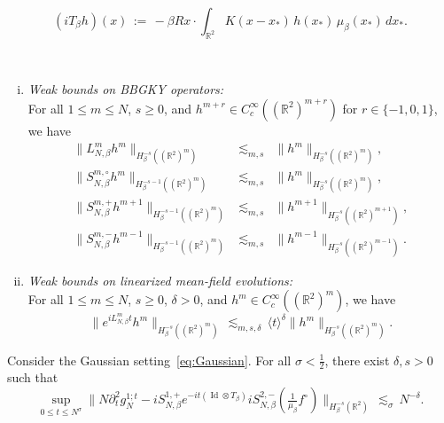 \documentclass[10pt,a4paper]{amsart}
\newcommand{\Id}{\operatorname{Id}}
\newcommand{\R}{\mathbb R}
\begin{document}
\begin{equation}\label{eq:def-Lbeta}
(iT_\beta h)(x)\,:=\,-\beta Rx\cdot\int_{\R^2} K(x-x_*) \,h(x_*)\,\mu_\beta(x_*)\,dx_*.
\end{equation}

\begin{lem}\label{lem:prelest-LS}\
\begin{enumerate}[(i)]
\item \emph{Weak bounds on BBGKY operators:}\\
For all $1\le m\le N$, $s\ge0$, and $h^{m+r}\in C^\infty_c((\R^2)^{m+r})$ for $r\in\{-1,0,1\}$, we have
\begin{eqnarray*}
\|L^{m}_{N,\beta}h^{m}\|_{H^{-s}_\beta((\R^2)^m)}&\lesssim_{m,s}&\|h^{m}\|_{H^{-s}_\beta((\R^2)^{m})},\\
\|S^{m,\circ}_{N,\beta}h^{m}\|_{H^{-s-1}_\beta((\R^2)^m)}&\lesssim_{m,s}&\|h^{m}\|_{H^{-s}_\beta((\R^2)^{m})},\\
\|S^{m,+}_{N,\beta}h^{m+1}\|_{H^{-s-1}_\beta((\R^2)^m)}&\lesssim_{m,s}&\|h^{m+1}\|_{H^{-s}_\beta((\R^2)^{m+1})},\\
\|S^{m,-}_{N,\beta}h^{m-1}\|_{H^{-s-1}_\beta((\R^2)^m)}&\lesssim_{m,s}&\|h^{m-1}\|_{H^{-s}_\beta((\R^2)^{m-1})}.
\end{eqnarray*}
\item \emph{Weak bounds on linearized mean-field evolutions:}\\
For all $1\le m\le N$, $s\ge0$, $\delta>0$, and $h^m\in C^\infty_c((\R^2)^{m})$, we have
\[\|e^{iL_{N,\beta}^mt}h^m\|_{H^{-s}_\beta((\R^2)^m)}\,\lesssim_{m,s,\delta}\,\langle t\rangle^{\delta}\|h^m\|_{H^{-s}_\beta((\R^2)^m)}.\]
\end{enumerate}
\end{lem}

\begin{lem}\label{lem:approx-dt2g1-gaus}
Consider the Gaussian setting~\eqref{eq:Gaussian}.
For all $\sigma<\frac12$, there exist $\delta,s>0$
such that
\begin{equation*}
\sup_{0\le t\le N^\sigma}\Big\|N\partial_t^2g_N^{1;t}-iS_{N,\beta}^{1,+}e^{-it(\Id\otimes T_\beta)}iS_{N,\beta}^{2,-}(\tfrac1{\mu_\beta}f^\circ)\Big\|_{H^{-s}_\beta(\R^2)}\,\lesssim_\sigma\,N^{-\delta}.
\end{equation*}
\end{lem}
\end{document}
